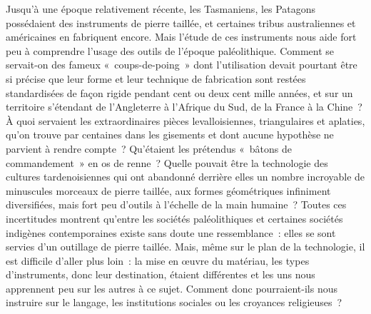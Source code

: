\documentclass[french,twoside]{book} %
\begin{document}
Jusqu’à une époque relativement récente, les Tasmaniens, les Patagons possédaient des instruments de pierre taillée, et certaines tribus australiennes et américaines en fabriquent encore. Mais l’étude de ces instruments nous aide fort peu à comprendre l’usage des outils de l’époque paléolithique. Comment se servait-on des fameux « coups-de-poing » dont l’utilisation devait pourtant être si précise que leur forme et leur technique de fabrication sont restées standardisées de façon rigide pendant cent ou deux cent mille années, et sur un territoire s’étendant de l’Angleterre à l’Afrique du Sud, de la France à la Chine ? À quoi servaient les extraordinaires pièces levalloisiennes, triangulaires et aplaties, qu’on trouve par centaines dans les gisements et dont aucune hypothèse ne parvient à rendre compte ? Qu’étaient les prétendus « bâtons de commandement » en os de renne ? Quelle pouvait être la technologie des cultures tardenoisiennes qui ont abandonné derrière elles un nombre incroyable de minuscules morceaux de pierre taillée, aux formes géométriques infiniment diversifiées, mais fort peu d’outils à l’échelle de la main humaine ? Toutes ces incertitudes montrent qu’entre les sociétés paléolithiques et certaines sociétés indigènes contemporaines existe sans doute une ressemblance : elles se sont servies d’un outillage de pierre taillée. Mais, même sur le plan de la technologie, il est difficile d’aller plus loin : la mise en œuvre du matériau, les types d’instruments, donc leur destination, étaient différentes et les uns nous apprennent peu sur les autres à ce sujet. Comment donc pourraient-ils nous instruire sur le langage, les institutions sociales ou les croyances religieuses ?\par
\end{document}

